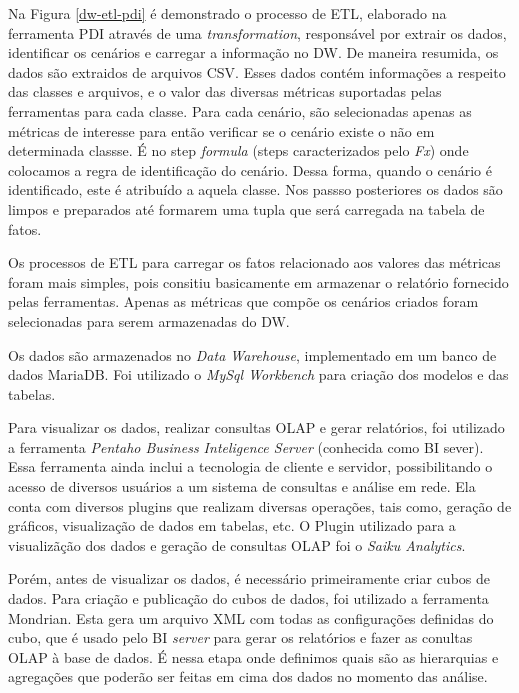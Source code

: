 Na Figura \ref{dw-etl-pdi} é demonstrado o processo de ETL, elaborado na ferramenta PDI através de uma \emph{transformation}, responsável por extrair os dados, identificar os cenários e carregar a informação no DW. De maneira resumida, os dados são extraidos de arquivos CSV. Esses dados contém informações a respeito das classes e arquivos, e o valor das diversas métricas suportadas pelas ferramentas para cada classe. Para cada cenário, são selecionadas apenas as métricas de interesse para então verificar se o cenário existe o não em determinada classse. É no step \emph{formula} (steps caracterizados pelo \emph{Fx}) onde colocamos a regra de identificação do cenário. Dessa forma, quando o cenário é identificado, este é atribuído a aquela classe. Nos passso posteriores os dados são limpos e preparados até formarem uma tupla que será carregada na tabela de fatos. %


Os processos de ETL para carregar os fatos relacionado aos valores das métricas foram mais simples, pois consitiu basicamente em armazenar o relatório fornecido pelas ferramentas. Apenas as métricas que compõe os cenários criados foram selecionadas para serem armazenadas do DW.


Os dados são armazenados no \emph{Data Warehouse}, implementado em um banco de dados MariaDB. Foi utilizado o \emph{MySql Workbench} para criação dos modelos e das tabelas.


Para visualizar os dados, realizar consultas OLAP e gerar relatórios, foi utilizado a ferramenta \emph{Pentaho Business Inteligence Server} (conhecida como BI sever). Essa ferramenta ainda inclui a tecnologia de cliente e servidor, possibilitando o acesso de diversos usuários a um sistema de consultas e análise em rede. Ela conta com diversos plugins que realizam diversas operações, tais como, geração de gráficos, visualização de dados em tabelas, etc. O Plugin utilizado para a visualizãção dos dados e geração de consultas OLAP foi o \emph{Saiku Analytics}.

Porém, antes de visualizar os dados, é necessário primeiramente criar cubos de dados. Para criação e publicação do cubos de dados, foi utilizado a ferramenta Mondrian. Esta gera um arquivo XML com todas as configurações definidas do cubo, que é usado pelo BI \emph{server} para gerar os relatórios e fazer as conultas OLAP à base de dados. É nessa etapa onde definimos quais são as hierarquias e agregações que poderão ser feitas em cima dos dados no momento das análise.



